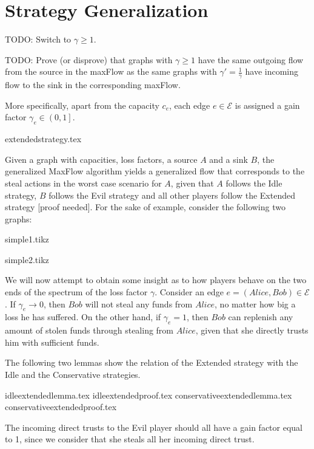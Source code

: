 \section{Strategy Generalization}
  TODO: Switch to $\gamma \geq 1$.

  TODO: Prove (or disprove) that graphs with $\gamma \geq 1$ have the same outgoing flow from the source in the maxFlow as the
  same graphs with $\gamma' = \frac{1}{\gamma}$ have incoming flow to the sink in the corresponding maxFlow.

  More specifically, apart from the capacity $c_e$, each edge $e \in \mathcal{E}$ is assigned a gain factor $\gamma_e \in
  \left(0, 1\right]$. 
  
  {extendedstrategy.tex}

  Given a graph with capacities, loss factors, a source $A$ and a sink $B$, the generalized MaxFlow algorithm yields a
  generalized flow that corresponds to the steal actions in the worst case scenario for $A$, given that $A$ follows the Idle
  strategy, $B$ follows the Evil strategy and all other players follow the Extended strategy [proof needed]. For the sake of
  example, consider the following two graphs:
  
  {simple1.tikz}

  {simple2.tikz}

  We will now attempt to obtain some insight as to how players behave on the two ends of the spectrum of the loss factor
  $\gamma$. Consider an edge $e = \left(Alice, Bob\right) \in \mathcal{E}$. If $\gamma_e \rightarrow 0$, then $Bob$ will not
  steal any funds from $Alice$, no matter how big a loss he has suffered. On the other hand, if $\gamma_e = 1$, then $Bob$ can
  replenish any amount of stolen funds through stealing from $Alice$, given that she directly trusts him with sufficient funds.
  
  The following two lemmas show the relation of the Extended strategy with the Idle and the Conservative strategies.
  
  {idleextendedlemma.tex}
  {idleextendedproof.tex}
  {conservativeextendedlemma.tex}
  {conservativeextendedproof.tex}

  The incoming direct trusts to the Evil player should all have a gain factor equal to 1, since we consider that she steals all
  her incoming direct trust.
